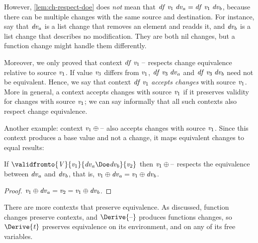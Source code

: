 However, \cref{lem:ch-respect-doe} does \emph{not} mean that \ensuremath{\Varid{df}\;\Varid{v}_{1}\;\Varid{dv}_a\mathrel{=}\Varid{df}\;\Varid{v}_{1}\;\Varid{dv}_b},
because there can be multiple changes with the same source and destination.
For instance, say that \ensuremath{\Varid{dv}_a} is a list change that removes an element and readds it,
and \ensuremath{\Varid{dv}_b} is a list change that describes no modification. They are both nil
changes, but a function change might handle them differently.

Moreover, we only proved that context \ensuremath{\Varid{df}\;\Varid{v}_{1}\;\text{\textendash}} respects change equivalence
relative to
source \ensuremath{\Varid{v}_{1}}. If value \ensuremath{\Varid{v}_{3}} differs from \ensuremath{\Varid{v}_{1}}, \ensuremath{\Varid{df}\;\Varid{v}_{3}\;\Varid{dv}_a} and \ensuremath{\Varid{df}\;\Varid{v}_{3}\;\Varid{dv}_b} need
not be equivalent. Hence, we say that context \ensuremath{\Varid{df}\;\Varid{v}_{1}} \emph{accepts changes}
with source \ensuremath{\Varid{v}_{1}}. More in general, a context accepts changes with source \ensuremath{\Varid{v}_{1}}
if it preserves validity for changes with source \ensuremath{\Varid{v}_{1}}; we can say informally
that all such contexts also respect change equivalence.

Another example: context \ensuremath{\Varid{v}_{1}\oplus \text{\textendash}} also accepts changes
with source \ensuremath{\Varid{v}_{1}}. Since this context produces a base value and not a change, it
maps equivalent changes to equal results:
\begin{lemma}
  \label{lem:oplus-respect-doe}
  If \ensuremath{\validfromto{\Conid{V}}{\Varid{v}_{1}}{\Varid{dv}_a\Doe\Varid{dv}_b}{\Varid{v}_{2}}} then \ensuremath{\Varid{v}_{1}\oplus \text{\textendash}} respects the
  equivalence between \ensuremath{\Varid{dv}_a} and \ensuremath{\Varid{dv}_b}, that is, \ensuremath{\Varid{v}_{1}\oplus \Varid{dv}_a\mathrel{=}\Varid{v}_{1}\oplus \Varid{dv}_b}.
\end{lemma}
\begin{proof}
  \ensuremath{\Varid{v}_{1}\oplus \Varid{dv}_a\mathrel{=}\Varid{v}_{2}\mathrel{=}\Varid{v}_{1}\oplus \Varid{dv}_b}.
\end{proof}

There are more contexts that preserve equivalence. As discussed, function
changes preserve contexts, and \ensuremath{\Derive{\text{\textendash}}} produces functions changes, so \ensuremath{\Derive{\Varid{t}}} preserves equivalence on its environment, and on any of its free variables.

